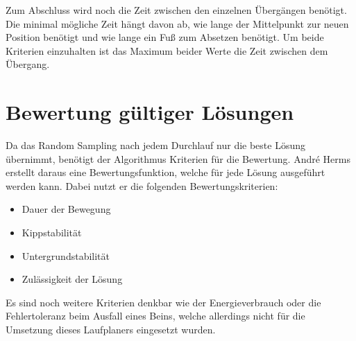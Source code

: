 Zum Abschluss wird noch die Zeit zwischen den einzelnen Übergängen benötigt. Die minimal mögliche Zeit hängt davon ab, wie lange der Mittelpunkt zur neuen Position benötigt und wie lange ein Fuß zum Absetzen benötigt. Um beide Kriterien einzuhalten ist das Maximum beider Werte die Zeit zwischen dem Übergang.

\section{Bewertung gültiger Lösungen}

Da das Random Sampling nach jedem Durchlauf nur die beste Lösung übernimmt, benötigt der Algorithmus Kriterien für die Bewertung. André Herms erstellt daraus eine Bewertungsfunktion, welche für jede Lösung ausgeführt werden kann. Dabei nutzt er die folgenden Bewertungskriterien:
\begin{itemize}
  \item Dauer der Bewegung
  \item Kippstabilität
  \item Untergrundstabilität
  \item Zulässigkeit der Lösung
\end{itemize}

Es sind noch weitere Kriterien denkbar wie der Energieverbrauch oder die Fehlertoleranz beim Ausfall eines Beins, welche allerdings nicht für die Umsetzung dieses Laufplaners eingesetzt wurden.